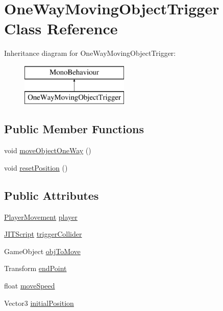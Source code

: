 \hypertarget{class_one_way_moving_object_trigger}{}\section{One\+Way\+Moving\+Object\+Trigger Class Reference}
\label{class_one_way_moving_object_trigger}
Inheritance diagram for One\+Way\+Moving\+Object\+Trigger\+:\begin{figure}[H]
\begin{center}
\leavevmode
\includegraphics[height=2.000000cm]{class_one_way_moving_object_trigger}
\end{center}
\end{figure}
\subsection*{Public Member Functions}
\begin{DoxyCompactItemize}
\item 
void \hyperlink{class_one_way_moving_object_trigger_a5ca6243e428f0bf25078650bce538acf}{move\+Object\+One\+Way} ()
\item 
void \hyperlink{class_one_way_moving_object_trigger_a4005f31ac588ca0362062a12061f1739}{reset\+Position} ()
\end{DoxyCompactItemize}
\subsection*{Public Attributes}
\begin{DoxyCompactItemize}
\item 
\hyperlink{class_player_movement}{Player\+Movement} \hyperlink{class_one_way_moving_object_trigger_a50456b25de1017bd53ae8950dff38148}{player}
\item 
\hyperlink{class_j_i_t_script}{J\+I\+T\+Script} \hyperlink{class_one_way_moving_object_trigger_a826ac8904700117919e40f3954901ba6}{trigger\+Collider}
\item 
Game\+Object \hyperlink{class_one_way_moving_object_trigger_a06663ffd79fa0ce74d186b0795d6b01b}{obj\+To\+Move}
\item 
Transform \hyperlink{class_one_way_moving_object_trigger_adee5de068d168a1b99fcf1f7e479150b}{end\+Point}
\item 
float \hyperlink{class_one_way_moving_object_trigger_a6da43dfdc11bf6498791d5a38e40722c}{move\+Speed}
\item 
Vector3 \hyperlink{class_one_way_moving_object_trigger_a86013b9388d8c1e3a88fd0fd2e8c6176}{initial\+Position}
\end{DoxyCompactItemize}


